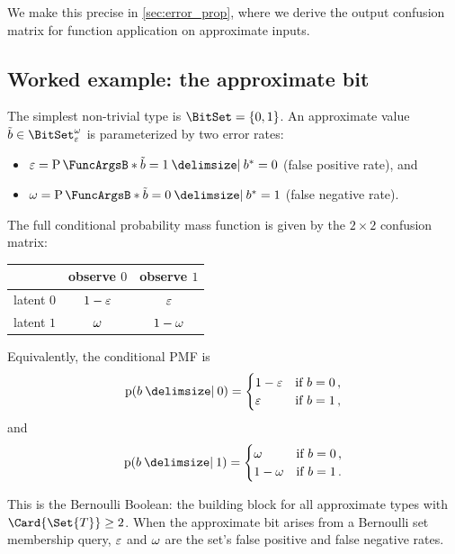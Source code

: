 \documentclass[ ../main.tex]{subfiles}
\begin{document}
We make this precise in \cref{sec:error_prop}, where we derive the output confusion matrix for function application on approximate inputs.

\subsection{Worked example: the approximate bit}
\label{sec:approx_bitset}

The simplest non-trivial type is $\BitSet = \{0, 1\}$.
An approximate value $\tilde{b} \in \AT{\BitSet}[\fprate][\fnrate]$ is parameterized by two error rates:
\begin{itemize}
\item $\fprate = \Prob{\tilde{b} = 1 \Given b^* = 0}$ (false positive rate), and
\item $\fnrate = \Prob{\tilde{b} = 0 \Given b^* = 1}$ (false negative rate).
\end{itemize}
The full conditional probability mass function is given by the $2 \times 2$ confusion matrix:

\begin{center}
\begin{tabular}{@{}lcc@{}}
\toprule
& observe $0$ & observe $1$ \\
\midrule
latent $0$ & $1 - \varepsilon$ & $\varepsilon$ \\
latent $1$ & $\omega$ & $1 - \omega$ \\
\bottomrule
\end{tabular}
\end{center}

Equivalently, the conditional PMF is
\begin{equation}
\label{eq:bitset_pmf_0}
\Fun{p}(b \Given 0) =
\begin{cases}
1 - \fprate & \text{if } b = 0\,, \\
\fprate     & \text{if } b = 1\,,
\end{cases}
\end{equation}
and
\begin{equation}
\label{eq:bitset_pmf_1}
\Fun{p}(b \Given 1) =
\begin{cases}
\fnrate     & \text{if } b = 0\,, \\
1 - \fnrate & \text{if } b = 1\,.
\end{cases}
\end{equation}

This is the Bernoulli Boolean: the building block for all approximate types with $\Card{\Set{T}} \geq 2$.
When the approximate bit arises from a Bernoulli set membership query, $\varepsilon$ and $\omega$ are the set's false positive and false negative rates.
\end{document}
